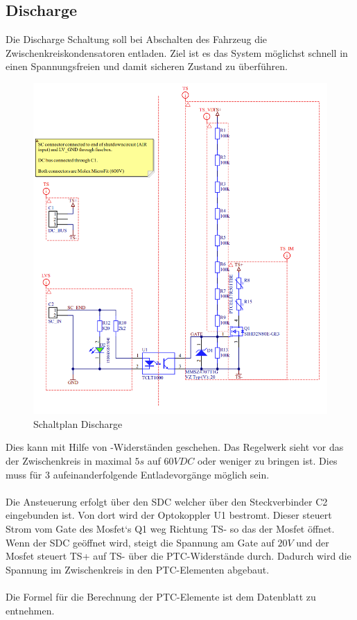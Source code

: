 \subsection{Discharge}
Die Discharge Schaltung soll bei Abschalten des Fahrzeug die Zwischenkreiskondensatoren entladen. Ziel ist es das System möglichst schnell in einen Spannungsfreien und damit sicheren Zustand zu überführen.
\begin{figure}
	\centering
	\includegraphics[width=0.7\linewidth]{bilder/Discharge}
	\caption{Schaltplan Discharge}
	\label{fig:discharge}
\end{figure}

Dies kann mit Hilfe von -Widerständen geschehen. Das Regelwerk sieht vor das der Zwischenkreis in maximal \ensuremath{5 s} auf \ensuremath{60 VDC} oder weniger zu bringen ist. Dies muss für 3 aufeinanderfolgende Entladevorgänge möglich sein. 
\\
\\
Die Ansteuerung erfolgt über den \ac{SDC} welcher über den Steckverbinder C2 eingebunden ist. Von dort wird der Optokoppler U1 bestromt. Dieser steuert Strom vom Gate des Mosfet`s Q1 weg Richtung \ac{TS}- so das der Mosfet öffnet. Wenn der \ac{SDC} geöffnet wird, steigt die Spannung am Gate auf \ensuremath{20 V} und der Mosfet steuert \ac{TS}+ auf \ac{TS}- über die \ac{PTC}-Widerstände durch. Dadurch wird die Spannung im Zwischenkreis in den \ac{PTC}-Elementen abgebaut.
\\
\\
Die Formel für die Berechnung der \ac{PTC}-Elemente ist dem Datenblatt \cite{PTCManual} zu entnehmen.

